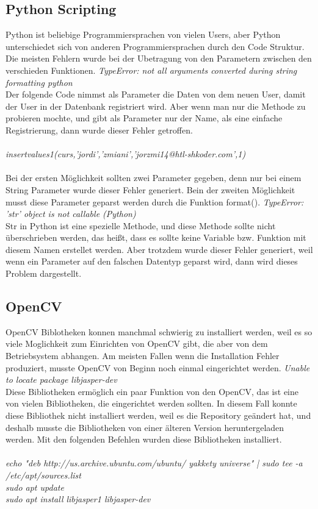 \subsection{Python Scripting}
Python ist beliebige Programmiersprachen von vielen Users, aber Python unterschiedet sich von anderen Programmiersprachen durch den Code Struktur. Die meisten Fehlern wurde bei der Ubetragung von den Parametern zwischen den verschieden Funktionen.
\bigbreak
\textit{TypeError: not all arguments converted during string formatting python}\\
Der folgende Code nimmst als Parameter die Daten von dem neuen User, damit der User in der Datenbank registriert wird. Aber wenn man nur die Methode zu probieren mochte, und gibt als Parameter nur der Name, als eine einfache Registrierung, dann wurde dieser Fehler getroffen. \\\\
\textit{insertvalues1(curs,'jordi','zmiani','jorzmi14@htl-shkoder.com',1)}\\\\
Bei der ersten Möglichkeit sollten zwei Parameter gegeben, denn nur bei einem String Parameter wurde dieser Fehler generiert.
Bein der zweiten Möglichkeit musst diese Parameter geparst werden durch die Funktion format().
\bigbreak
\textit{TypeError: 'str' object is not callable (Python)}\\
Str in Python ist eine spezielle Methode, und diese Methode sollte nicht überschrieben werden, das heißt, dass es sollte keine Variable bzw. Funktion mit diesem Namen erstellet werden. Aber trotzdem wurde dieser Fehler generiert, weil wenn ein Parameter auf den falschen Datentyp geparst wird, dann wird dieses Problem dargestellt.
\subsection{OpenCV}
OpenCV Biblotheken konnen manchmal schwierig zu installiert werden, weil es so viele Moglichkeit zum Einrichten von OpenCV gibt, die aber von dem Betriebsystem abhangen. Am meisten Fallen wenn die Installation Fehler produziert, musste OpenCV von Beginn noch einmal eingerichtet werden.
\bigbreak
\textit{Unable to locate package libjasper-dev}\\
Diese Bibliotheken ermöglich ein paar Funktion von den OpenCV, das ist eine von vielen Bibliotheken, die eingerichtet werden sollten. In diesem Fall konnte diese Bibliothek nicht installiert werden, weil es die Repository geändert hat, und deshalb musste die Bibliotheken von einer älteren Version heruntergeladen werden. Mit den folgenden Befehlen wurden diese Bibliotheken installiert.\\\\
\textit{echo "deb http://us.archive.ubuntu.com/ubuntu/ yakkety universe" | sudo tee -a \\ /etc/apt/sources.list}\\
\textit{sudo apt update}\\
\textit{sudo apt install libjasper1 libjasper-dev}

